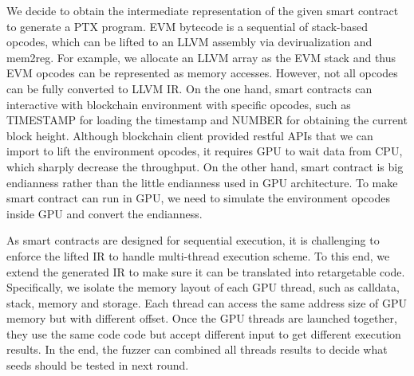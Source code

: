 \noindent \textbf{{\translator}}
We decide to obtain the intermediate representation of the given smart contract to generate a PTX program. 
EVM bytecode is a sequential of stack-based opcodes, which can be lifted to an LLVM assembly via devirualization and mem2reg\cite{}. For example, we allocate an LLVM array as the EVM stack and thus EVM opcodes can be represented as memory accesses. 
However, not all opcodes can be fully converted to LLVM IR.
On the one hand, smart contracts can interactive with blockchain environment with specific opcodes, such as TIMESTAMP for loading the timestamp and NUMBER for obtaining the current block height. Although blockchain client provided restful APIs that we can import to lift the environment opcodes, it requires GPU to wait data from CPU, which sharply decrease the {\tool} throughput.
%
On the other hand, smart contract is big endianness rather than the little endianness used in GPU architecture. 
To make smart contract can run in GPU, we need to simulate the environment opcodes inside GPU and convert the endianness. 


\noindent \textbf{{\wrapper}}
As smart contracts are designed for sequential execution, it is challenging to enforce the lifted IR to handle multi-thread execution scheme. 
To this end, we extend the generated IR to make sure it can be translated into retargetable code.
Specifically, we isolate the memory layout of each GPU thread, such as calldata, stack, memory and storage.
Each thread can access the same address size of GPU memory but with different offset. Once the GPU threads are launched together, they use the same code code but accept different input to get different execution results. In the end, the fuzzer can combined all threads results to decide what seeds should be tested in next round.